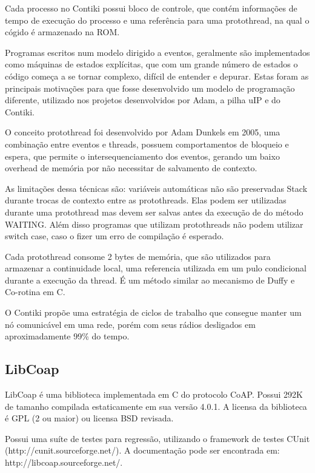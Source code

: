 Cada processo no Contiki possui bloco de controle, que cont\'em informa\-\c{c}\~oes de tempo de execu\c{c}\~ao do processo e uma refer\^encia para uma protothread, na qual o c\'ogido \'e armazenado na ROM. 

Programas escritos num modelo dirigido a eventos, geralmente s\~ao implementados como m\'aquinas de estados expl\'icitas, que com um grande n\'umero de estados o c\'odigo come\c{c}a a se tornar complexo, dif\'icil de entender e depurar. Estas foram as principais motiva\c{c}\~oes para que fosse desenvolvido um modelo de programa\c{c}\~ao diferente, utilizado nos projetos desenvolvidos por Adam, a pilha uIP e do Contiki.\cite{Dunkels05protothreads}

O conceito protothread foi desenvolvido por Adam Dunkels em 2005, uma combina\c{c}\~ao entre eventos e threads, possuem comportamentos de bloqueio e espera, que permite o intersequenciamento dos eventos, gerando um baixo overhead de mem\'oria por n\~ao necessitar de salvamento de contexto.

As limita\c{c}\~oes dessa t\'ecnicas s\~ao: vari\'aveis autom\'aticas n\~ao s\~ao preservadas Stack durante trocas de contexto entre as protothreads. Elas podem ser utilizadas durante uma protothread mas devem ser salvas antes da execu\c{c}\~ao de do m\'etodo WAITING. Al\'em disso programas que utilizam protothreads n\~ao podem utilizar switch case, caso o fizer um erro de compila\c{c}\~ao \'e esperado.

Cada protothread consome 2 bytes de mem\'oria, que s\~ao utilizados para armazenar a continuidade local, uma referencia utilizada em um pulo condicional durante a execu\c{c}\~ao da thread. \'E um m\'etodo similar ao mecanismo de Duffy e Co-rotina em C. \cite{duffyMechanism}

O Contiki prop\~oe uma estrat\'egia de ciclos de trabalho que consegue manter um n\'o comunic\'avel em uma rede, por\'em com seus r\'adios desligados em aproximadamente 99\% do tempo.\cite{Dunkels11thecontikimac}

\subsection{LibCoap}
LibCoap \'e uma biblioteca implementada em C do protocolo CoAP. Possui 292K de tamanho compilada estaticamente em sua vers\~ao 4.0.1.
A licensa da biblioteca \'e GPL (2 ou maior) ou licensa BSD revisada.

Possui uma su\'ite de testes para regress\~ao, utilizando o framework de testes CUnit (http://cunit.sourceforge.net/). A documenta\c{c}\~ao pode ser encontrada em: http://libcoap.sourceforge.net/.

